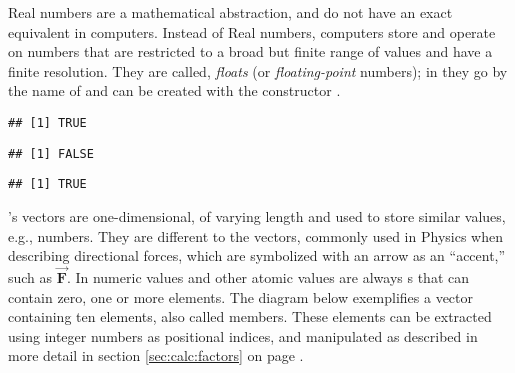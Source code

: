 \documentclass[krantz2]{krantz}\usepackage{knitr}
\begin{document}
\begin{explainbox}
Real numbers are a mathematical abstraction, and do not have an exact equivalent in computers. Instead of Real numbers, computers store and operate on numbers that are restricted to a broad but finite range of values and have a finite resolution. They are called, \emph{floats} (or \emph{floating-point} numbers); in \Rlang they go by the name of  and can be created with the constructor .

\begin{knitrout}\footnotesize
{}\color{fgcolor}\begin{kframe}
\begin{alltt}
\hlstd{(}\hlstd{)}
\end{alltt}
\begin{verbatim}
## [1] TRUE
\end{verbatim}
\begin{alltt}
\hlstd{(}\hlstd{)}
\end{alltt}
\begin{verbatim}
## [1] FALSE
\end{verbatim}
\begin{alltt}
\hlstd{(}\hlstd{)}
\end{alltt}
\begin{verbatim}
## [1] TRUE
\end{verbatim}
\end{kframe}
\end{knitrout}

\end{explainbox}

\label{par:calc:vectors:diag}
\Rlang's vectors\label{par:numeric:vectors:start} are one-dimensional, of varying length and used to store similar values, e.g., numbers. They are different to the vectors, commonly used in Physics when describing directional forces, which are symbolized with an arrow as an ``accent,'' such as $\overrightarrow{\mathbf{F}}$. In \Rlang numeric values and other atomic values are always s that can contain zero, one or more elements. The diagram below exemplifies a vector containing ten elements, also called members. These elements can be extracted using integer numbers as positional indices, and manipulated as described in more detail in section \ref{sec:calc:factors} on page \pageref{sec:calc:factors}.\vspace{1ex}
\end{document}
